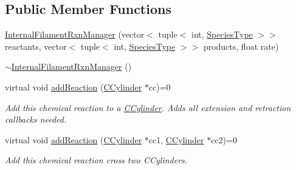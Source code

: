 \subsection*{Public Member Functions}
\begin{DoxyCompactItemize}
\item 
\hyperlink{classInternalFilamentRxnManager_a2972bf77f48cada1ef30d8420924834e}{Internal\+Filament\+Rxn\+Manager} (vector$<$ tuple$<$ int, \hyperlink{Species_8h_a50651af47c56ea0e27235468d23542cf}{Species\+Type} $>$$>$ reactants, vector$<$ tuple$<$ int, \hyperlink{Species_8h_a50651af47c56ea0e27235468d23542cf}{Species\+Type} $>$$>$ products, float rate)
\item 
\hyperlink{classInternalFilamentRxnManager_aa779e524843d4d45fa81002a64a0964e}{$\sim$\+Internal\+Filament\+Rxn\+Manager} ()
\item 
virtual void \hyperlink{classInternalFilamentRxnManager_a45f1ff9c676e41db408669ab6c5242e9}{add\+Reaction} (\hyperlink{classCCylinder}{C\+Cylinder} $\ast$cc)=0
\begin{DoxyCompactList}\small\item\em Add this chemical reaction to a \hyperlink{classCCylinder}{C\+Cylinder}. Adds all extension and retraction callbacks needed. \end{DoxyCompactList}\item 
virtual void \hyperlink{classInternalFilamentRxnManager_ac8152bcd9f6aa5d69f85a98cff86d2b0}{add\+Reaction} (\hyperlink{classCCylinder}{C\+Cylinder} $\ast$cc1, \hyperlink{classCCylinder}{C\+Cylinder} $\ast$cc2)=0
\begin{DoxyCompactList}\small\item\em Add this chemical reaction cross two C\+Cylinders. \end{DoxyCompactList}\end{DoxyCompactItemize}
